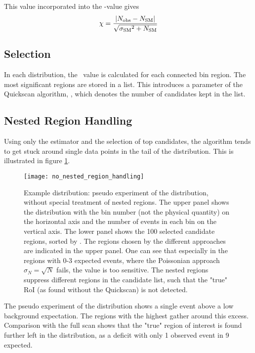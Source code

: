 This value incorporated into the \mychi-value gives
\begin{equation}
\chi = \frac{|{N_\mathrm{obs}} - {N_\mathrm{SM}}|}{\sqrt{{\sigma_\mathrm{SM}}^2 + {N_\mathrm{SM}}}}
\end{equation}

\subsection{Selection}
In each distribution, the \mychi~value is calculated for each connected bin region. The most significant regions are stored in a list. This introduces a parameter of the Quickscan algorithm, \paramregions, which denotes the number of candidates kept in the list.

\subsection{Nested Region Handling}
Using only the estimator and the selection of top \paramregions candidates, the algorithm tends to get stuck around single data points in the tail of the distribution. This is illustrated in figure \ref{fig:no_nested_region_handling}. 
\begin{figure}[htb]
	\centering
	\texttt{[image: no\_nested\_region\_handling]}
	\caption{Example distribution: pseudo experiment of the  \sumpT distribution, without special treatment of nested regions. The upper panel shows the distribution with the bin number (not the physical quantity) on the horizontal axis and the number of events in each bin on the vertical axis. The lower panel shows the 100 selected candidate regions, sorted by \mychi. The regions chosen by the different approaches are indicated in the upper panel. One can see that especially in the regions with 0-3 expected events, where the Poissonian approach $\sigma_N = \sqrt{N}$ fails, the \mychi value is too sensitive. The nested regions suppress different regions in the candidate list, such that the "true" RoI (as found without the Quickscan) is not detected.}
	\label{fig:no_nested_region_handling}
\end{figure}
The pseudo experiment of the  \sumpT distribution shows a single event above a low background expectation. The regions with the highest \mychi gather around this excess. Comparison with the full scan shows that the "true" region of interest is found further left in the distribution, as a deficit with only 1 observed event in 9 expected.

